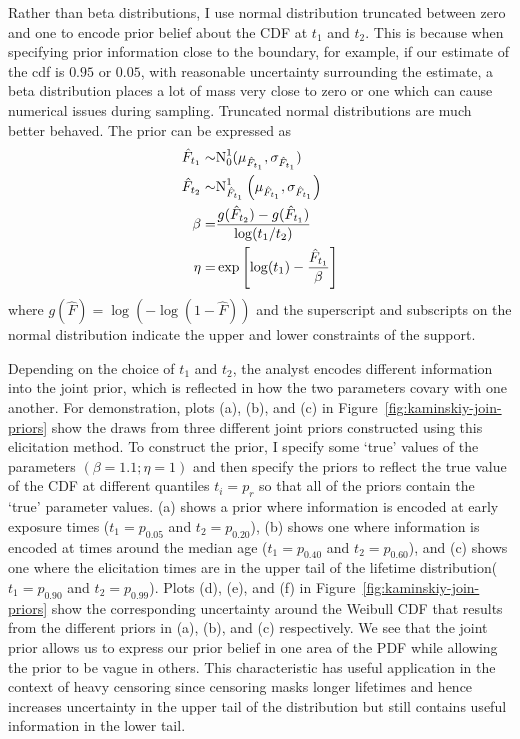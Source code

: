 Rather than beta distributions, I use normal distribution truncated between zero and one to encode prior belief about the CDF at $t_1$ and $t_2$. This is because when specifying prior information close to the boundary, for example, if our estimate of the cdf is $0.95$ or $0.05$, with reasonable uncertainty surrounding the estimate, a beta distribution places a lot of mass very close to zero or one which can cause numerical issues during sampling. Truncated normal distributions are much better behaved. The prior can be expressed as
\begin{align*}
    \hat{F}_{t_1} \sim & \hbox{N}^{1}_{0}(\mu_{\hat{F}_{t_1}}, \sigma_{\hat{F}_{t_1}})             \\
    \hat{F}_{t_2} \sim & \hbox{N}^{1}_{\hat{F}_{t_1}}\left(\mu_{\hat{F}_{t_1}}, \sigma_{\hat{F}_{t_1}}\right) \\
    \beta            = & \frac{g(\hat{F}_{t_2}) - g(\hat{F}_{t_1})}{\log(t_1 / t_2)}               \\
    \eta             = & \exp\left[\log(t_1) - \frac{\hat{F}_{t_1}}{\beta}\right]
\end{align*}
where $g(\hat{F}) = \log(-\log(1 - \hat{F}))$ and the superscript and subscripts on the normal distribution indicate the upper and lower constraints of the support.

Depending on the choice of $t_1$ and $t_2$, the analyst encodes different information into the joint prior, which is reflected in how the two parameters covary with one another. For demonstration, plots (a), (b), and (c) in Figure~\ref{fig:kaminskiy-join-priors} show the draws from three different joint priors constructed using this elicitation method. To construct the prior, I specify some `true' values of the parameters $(\beta = 1.1; \eta = 1)$ and then specify the priors to reflect the true value of the CDF at different quantiles $t_i = p_r$ so that all of the priors contain the `true' parameter values. (a) shows a prior where information is encoded at early exposure times ($t_1 = p_{0.05}$ and $t_2 = p_{0.20}$), (b) shows one where information is encoded at times around the median age ($t_1 = p_{0.40}$ and $t_2 = p_{0.60}$), and (c) shows one where the elicitation times are in the upper tail of the lifetime distribution($t_1 = p_{0.90}$ and $t_2 = p_{0.99}$). Plots (d), (e), and (f) in Figure~\ref{fig:kaminskiy-join-priors} show the corresponding uncertainty around the Weibull CDF that results from the different priors in (a), (b), and (c) respectively. We see that the joint prior allows us to express our prior belief in one area of the PDF while allowing the prior to be vague in others. This characteristic has useful application in the context of heavy censoring since censoring masks longer lifetimes and hence increases uncertainty in the upper tail of the distribution but still contains useful information in the lower tail.

